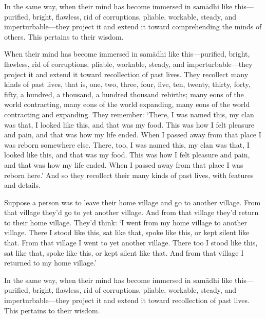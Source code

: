 \documentclass[12pt,openany]{book}%
\begin{document}
In the same way, when their mind has become immersed in \textsanskrit{samādhi} like this—purified, bright, flawless, rid of corruptions, pliable, workable, steady, and imperturbable—they project it and extend it toward comprehending the minds of others. This pertains to their wisdom. 

When their mind has become immersed in \textsanskrit{samādhi} like this—purified, bright, flawless, rid of corruptions, pliable, workable, steady, and imperturbable—they project it and extend it toward recollection of past lives. They recollect many kinds of past lives, that is, one, two, three, four, five, ten, twenty, thirty, forty, fifty, a hundred, a thousand, a hundred thousand rebirths; many eons of the world contracting, many eons of the world expanding, many eons of the world contracting and expanding. They remember: ‘There, I was named this, my clan was that, I looked like this, and that was my food. This was how I felt pleasure and pain, and that was how my life ended. When I passed away from that place I was reborn somewhere else. There, too, I was named this, my clan was that, I looked like this, and that was my food. This was how I felt pleasure and pain, and that was how my life ended. When I passed away from that place I was reborn here.’ And so they recollect their many kinds of past lives, with features and details. 

Suppose a person was to leave their home village and go to another village. From that village they’d go to yet another village. And from that village they’d return to their home village. They’d think: ‘I went from my home village to another village. There I stood like this, sat like that, spoke like this, or kept silent like that. From that village I went to yet another village. There too I stood like this, sat like that, spoke like this, or kept silent like that. And from that village I returned to my home village.’ 

In the same way, when their mind has become immersed in \textsanskrit{samādhi} like this—purified, bright, flawless, rid of corruptions, pliable, workable, steady, and imperturbable—they project it and extend it toward recollection of past lives. This pertains to their wisdom. 
\end{document}
